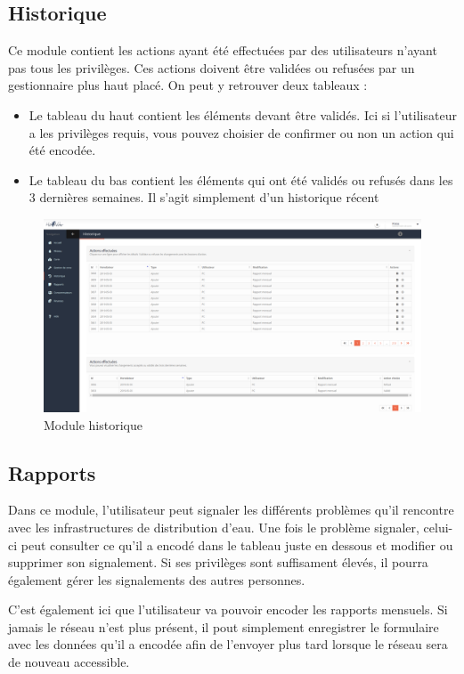 \documentclass{EPL-master-thesis-covers-FR}
\begin{document}
			\subsection{Historique}
				Ce module contient les actions ayant été effectuées par des utilisateurs n'ayant pas tous les privilèges. Ces actions doivent être validées ou refusées par un gestionnaire plus haut placé. On peut y retrouver deux tableaux :
				\begin{itemize}
					\item Le tableau du haut contient les éléments devant être validés. Ici si l'utilisateur a les privilèges requis, vous pouvez choisier de confirmer ou non un action qui été encodée.
					\item Le tableau du bas contient les éléments qui ont été validés ou refusés dans les 3 dernières semaines. Il s'agit simplement d'un historique récent
				\end{itemize}
				\begin{figure}[H]
					\centering
					\includegraphics[width=1\textwidth]{images/historique}
					\caption{Module historique}
				\end{figure}
			
			\subsection{Rapports}
				Dans ce module, l'utilisateur peut signaler les différents problèmes qu'il rencontre avec les infrastructures de distribution d'eau. Une fois le problème signaler, celui-ci peut consulter ce qu'il a encodé dans le tableau juste en dessous et modifier ou supprimer son signalement. Si ses privilèges sont suffisament élevés, il pourra également gérer les signalements des autres personnes.
				
				C'est également ici que l'utilisateur va pouvoir encoder les rapports mensuels. Si jamais le réseau n'est plus présent, il pout simplement enregistrer le formulaire avec les données qu'il a encodée afin de l'envoyer plus tard lorsque le réseau sera de nouveau accessible.
				
\end{document}
